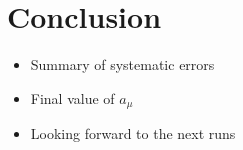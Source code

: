 \documentclass[12pt,letterpaper]{article}
\begin{document}
\section{Conclusion}

\begin{itemize}
	\item{Summary of systematic errors}
	\item{Final value of $a_{\mu}$}
	\item{Looking forward to the next runs}
\end{itemize}
\end{document}
